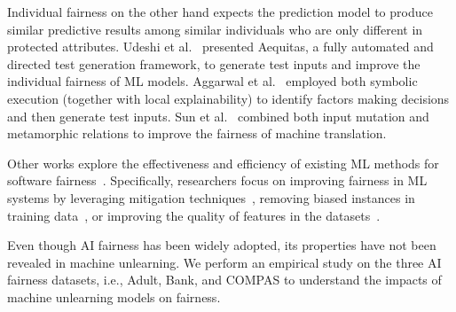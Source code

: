 Individual fairness on the other hand expects the prediction model to produce similar predictive results among similar individuals who are only different in protected attributes. 
Udeshi et al.~\cite{udeshi2018automated} presented Aequitas, a fully automated and directed test generation framework, to generate test inputs and improve the individual fairness of ML models. Aggarwal et al.~\cite{aggarwal2019black} employed both symbolic execution (together with local explainability) to identify factors making decisions and then generate test inputs. Sun et al.~\cite{sun2020automatic} combined both input mutation and metamorphic relations to improve the fairness of machine translation.


Other works explore the effectiveness and efficiency of existing ML methods for software fairness~\cite{biswas2020machine, chakraborty2020fairway, zhang2021ignorance}. Specifically, researchers focus on improving fairness in ML systems by leveraging mitigation techniques~\cite{biswas2020machine}, removing biased instances in training data~\cite{chakraborty2020fairway}, or improving the quality of features in the datasets~\cite{zhang2021ignorance}.

Even though AI fairness has been widely adopted, its properties have not been revealed in machine unlearning. We perform an empirical study on the three AI fairness datasets, i.e., Adult, Bank, and COMPAS to understand the impacts of machine unlearning models on fairness.

